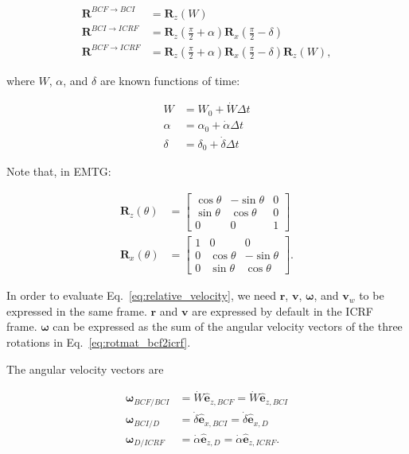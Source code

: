 \documentclass[]{article}
\newcommand{\vb}[1]{\bm{#1}} %
\newcommand{\vbh}[1]{\hat{\bm{#1}}} %
\begin{document}
\begin{align}
	\vb{R}^{BCF \rightarrow BCI} &= \vb{R}_z (W) \\
	\vb{R}^{BCI \rightarrow ICRF} &= \vb{R}_z \left(\frac{\pi}{2} + \alpha \right) \vb{R}_x \left( \frac{\pi}{2} - \delta \right) \\
	\label{eq:rotmat_bcf2icrf}
	\vb{R}^{BCF \rightarrow ICRF} &= \vb{R}_z \left(\frac{\pi}{2} + \alpha \right) \vb{R}_x \left( \frac{\pi}{2} - \delta \right) \vb{R}_z (W),
\end{align}

\noindent where $W$, $\alpha$, and $\delta$ are known functions of time:

\begin{align}
	W &= W_0 + \dot{W} \Delta t \\
	\alpha &= \alpha_0 + \dot{\alpha} \Delta t \\
	\delta &= \delta_0 + \dot{\delta} \Delta t
\end{align}

Note that, in EMTG:

\begin{align}
	\vb{R}_z (\theta) &=
	\left[ \begin{array}{ccc}
	\cos \theta & -\sin \theta & 0 \\
	\sin \theta & \cos \theta & 0 \\
	0 & 0 & 1
	\end{array} \right] \\
	\vb{R}_x (\theta) &=
	\left[ \begin{array}{ccc}
	1 & 0 & 0 \\
	0 & \cos \theta & -\sin \theta \\
	0 & \sin \theta & \cos \theta
	\end{array} \right].
\end{align}

In order to evaluate Eq.~\eqref{eq:relative_velocity}, we need $\vb{r}$, $\vb{v}$, $\vb{\omega}$, and $\vb{v}_w$ to be expressed in the same frame. $\vb{r}$ and $\vb{v}$ are expressed by default in the ICRF frame. $\vb{\omega}$ can be expressed as the sum of the angular velocity vectors of the three rotations in Eq.~\eqref{eq:rotmat_bcf2icrf}.

The angular velocity vectors are

\begin{align}
	\vb{\omega}_{BCF/BCI} &= \dot{W} \vbh{e}_{z, BCF} = \dot{W} \vbh{e}_{z, BCI} \\
	\vb{\omega}_{BCI/D} &= \dot{\delta} \vbh{e}_{x, BCI} = \dot{\delta} \vbh{e}_{x, D} \\
	\vb{\omega}_{D/ICRF} &= \dot{\alpha} \vbh{e}_{z, D} = \dot{\alpha} \vbh{e}_{z, ICRF}.
\end{align}
\end{document}
